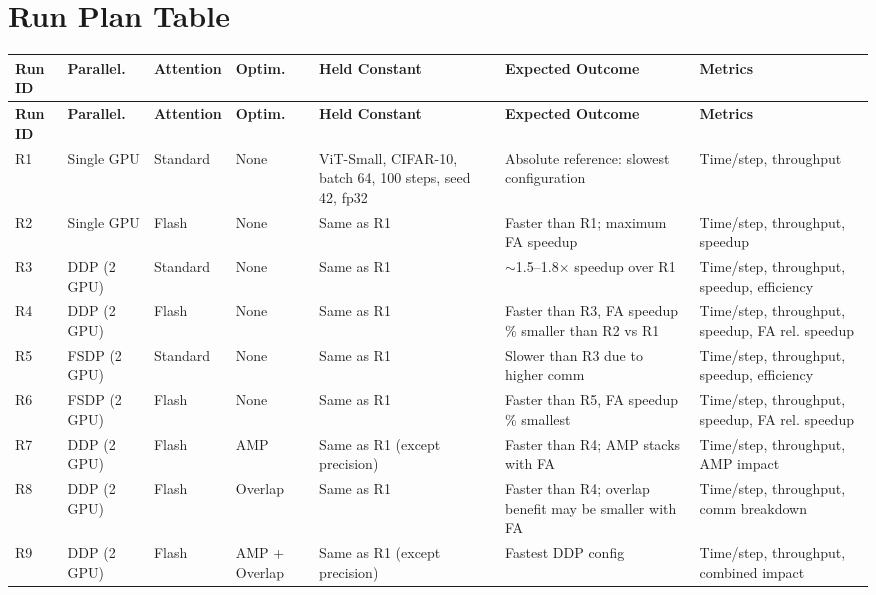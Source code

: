 \documentclass[12pt, a4paper]{article}
\begin{document}
\section{Run Plan Table}

\begin{singlespace}
\small
\begin{longtable}{>{\raggedright\arraybackslash}p{0.8cm} >{\raggedright\arraybackslash}p{1.8cm} >{\raggedright\arraybackslash}p{1.8cm} >{\raggedright\arraybackslash}p{1.8cm} >{\raggedright\arraybackslash}p{2.2cm} >{\raggedright\arraybackslash}p{2.8cm} >{\raggedright\arraybackslash}p{2.2cm}}
\toprule
\textbf{Run ID} & \textbf{Parallel.} & \textbf{Attention} & \textbf{Optim.} & \textbf{Held Constant} & \textbf{Expected Outcome} & \textbf{Metrics} \\
\midrule
\endfirsthead
\toprule
\textbf{Run ID} & \textbf{Parallel.} & \textbf{Attention} & \textbf{Optim.} & \textbf{Held Constant} & \textbf{Expected Outcome} & \textbf{Metrics} \\
\midrule
\endhead
\bottomrule
\endfoot

R1 & Single GPU & Standard & None & ViT-Small, CIFAR-10, batch 64, 100 steps, seed 42, fp32 & Absolute reference: slowest configuration & Time/step, throughput \\
\midrule
R2 & Single GPU & Flash & None & Same as R1 & Faster than R1; maximum FA speedup & Time/step, throughput, speedup \\
\midrule
R3 & DDP (2 GPU) & Standard & None & Same as R1 & $\sim$1.5--1.8$\times$ speedup over R1 & Time/step, throughput, speedup, efficiency \\
\midrule
R4 & DDP (2 GPU) & Flash & None & Same as R1 & Faster than R3, FA speedup \% smaller than R2 vs R1 & Time/step, throughput, speedup, FA rel. speedup \\
\midrule
R5 & FSDP (2 GPU) & Standard & None & Same as R1 & Slower than R3 due to higher comm & Time/step, throughput, speedup, efficiency \\
\midrule
R6 & FSDP (2 GPU) & Flash & None & Same as R1 & Faster than R5, FA speedup \% smallest & Time/step, throughput, speedup, FA rel. speedup \\
\midrule
R7 & DDP (2 GPU) & Flash & AMP & Same as R1 (except precision) & Faster than R4; AMP stacks with FA & Time/step, throughput, AMP impact \\
\midrule
R8 & DDP (2 GPU) & Flash & Overlap & Same as R1 & Faster than R4; overlap benefit may be smaller with FA & Time/step, throughput, comm breakdown \\
\midrule
R9 & DDP (2 GPU) & Flash & AMP + Overlap & Same as R1 (except precision) & Fastest DDP config & Time/step, throughput, combined impact \\

\end{longtable}
\end{singlespace}
\end{document}
